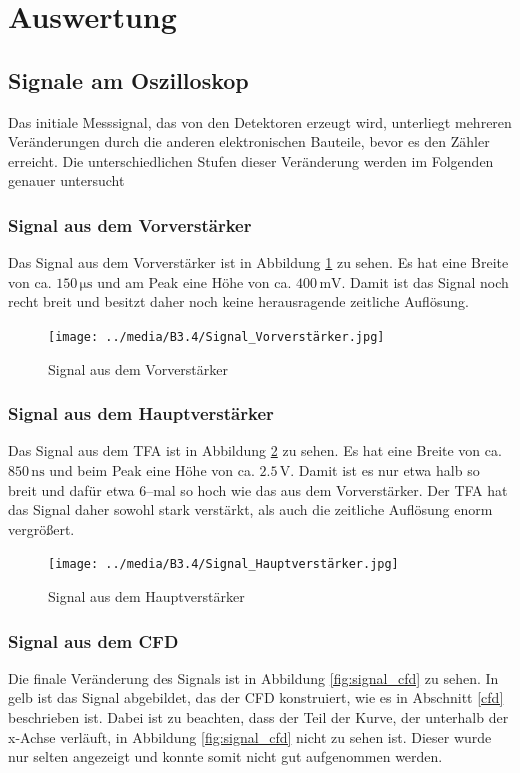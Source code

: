 \documentclass[12pt,a4paper]{scrartcl}
\numberwithin{equation}{section} %
\begin{document}
\clearpage
\hypertarget{auswertung}{%
\section{Auswertung}\label{auswertung}}

\subsection{Signale am Oszilloskop}
Das initiale Messsignal, das von den Detektoren erzeugt wird, unterliegt mehreren Veränderungen durch die anderen elektronischen Bauteile, bevor es den Zähler erreicht. Die unterschiedlichen Stufen dieser Veränderung werden im Folgenden genauer untersucht

\subsubsection{Signal aus dem Vorverstärker}
Das Signal aus dem Vorverstärker ist in Abbildung \ref{fig:signal_vv} zu sehen. Es hat eine Breite von ca. $150 \mathrm{\, \mu s}$ und am Peak eine Höhe von ca. $400 \mathrm{\, mV}$. Damit ist das Signal noch recht breit und besitzt daher noch keine herausragende zeitliche Auflösung.

\begin{figure}[h]
	\centering
	\texttt{[image: ../media/B3.4/Signal\_Vorverstärker.jpg]}
	\caption{Signal aus dem Vorverstärker}
	\label{fig:signal_vv}
\end{figure}

\subsubsection{Signal aus dem Hauptverstärker}
Das Signal aus dem TFA ist in Abbildung \ref{fig:signal_vv+hv} zu sehen. Es hat eine Breite von ca. $850 \mathrm{\, ns}$ und beim Peak eine Höhe von ca. $2.5 \mathrm{\, V}$. Damit ist es nur etwa halb so breit und dafür etwa $6$--mal so hoch wie das aus dem Vorverstärker. Der TFA hat das Signal daher sowohl stark verstärkt, als auch die zeitliche Auflösung enorm vergrößert.

\begin{figure}[h]
	\centering
	\texttt{[image: ../media/B3.4/Signal\_Hauptverstärker.jpg]}
	\caption{Signal aus dem Hauptverstärker}
	\label{fig:signal_vv+hv}
\end{figure}

\subsubsection{Signal aus dem CFD}
Die finale Veränderung des Signals ist in Abbildung \ref{fig:signal_cfd} zu sehen. In gelb ist das Signal abgebildet, das der CFD konstruiert, wie es in Abschnitt \ref{cfd} beschrieben ist. Dabei ist zu beachten, dass der Teil der Kurve, der unterhalb der x-Achse verläuft, in Abbildung \ref{fig:signal_cfd} nicht zu sehen ist. Dieser wurde nur selten angezeigt und konnte somit nicht gut aufgenommen werden.
\end{document}
